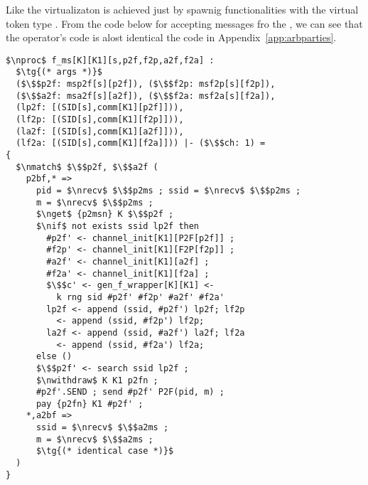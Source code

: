 Like the \partywrapper virtualizaton is achieved just by spawnig functionalities with the virtual token type .
From the code below for accepting messages fro the \partywrapper, we can see that the operator's code is alost identical the code in Appendix~\ref{app:arbparties}.
\begin{lstlisting}[basicstyle=\footnotesize\BeraMonottFamily, frame=single, mathescape]
$\nproc$ f_ms[K][K1][s,p2f,f2p,a2f,f2a] :
  $\tg{(* args *)}$
  ($\$$p2f: msp2f[s][p2f]), ($\$$f2p: msf2p[s][f2p]),
  ($\$$a2f: msa2f[s][a2f]), ($\$$f2a: msf2a[s][f2a]),
  (lp2f: [(SID[s],comm[K1][p2f]])), 
  (lf2p: [(SID[s],comm[K1][f2p]])), 
  (la2f: [(SID[s],comm[K1][a2f]])), 
  (lf2a: [(SID[s],comm[K1][f2a]])) |- ($\$$ch: 1) =
{
  $\nmatch$ $\$$p2f, $\$$a2f (
    p2bf,* =>
      pid = $\nrecv$ $\$$p2ms ; ssid = $\nrecv$ $\$$p2ms ;
      m = $\nrecv$ $\$$p2ms ;
      $\nget$ {p2msn} K $\$$p2f ;
      $\nif$ not exists ssid lp2f then
        #p2f' <- channel_init[K1][P2F[p2f]] ;
        #f2p' <- channel_init[K1][F2P[f2p]] ;
        #a2f' <- channel_init[K1][a2f] ;
        #f2a' <- channel_init[K1][f2a] ;
        $\$$c' <- gen_f_wrapper[K][K1] <- 
          k rng sid #p2f' #f2p' #a2f' #f2a'
        lp2f <- append (ssid, #p2f') lp2f; lf2p 
          <- append (ssid, #f2p') lf2p;
        la2f <- append (ssid, #a2f') la2f; lf2a 
          <- append (ssid, #f2a') lf2a;
      else ()
      $\$$p2f' <- search ssid lp2f ;
      $\nwithdraw$ K K1 p2fn ;
      #p2f'.SEND ; send #p2f' P2F(pid, m) ; 
      pay {p2fn} K1 #p2f' ;
    *,a2bf => 
      ssid = $\nrecv$ $\$$a2ms ;
      m = $\nrecv$ $\$$a2ms ;
      $\tg{(* identical case *)}$
  )
} 
\end{lstlisting}

